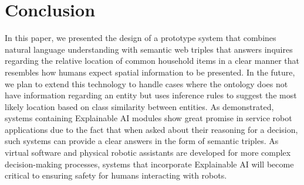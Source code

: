 \documentclass{article}
\begin{document}
\section{Conclusion}
In this paper, we presented the design of a prototype system that combines 
natural language understanding with semantic web triples that answers 
inquires regarding the relative location of common household items in a clear
manner that resembles how humans expect spatial information to be presented.
In the future, we plan to extend this technology to handle cases where the 
ontology does not have information regarding an entity but uses inference
rules to suggest the most likely location based on class similarity between
entities. As demonstrated, systems containing Explainable AI modules show
great promise in service robot applications due to the fact that when asked
about their reasoning for a decision, such systems can provide a clear answers
in the form of semantic triples. As virtual software and physical robotic 
assistants are developed for more complex decision-making processes, systems
that incorporate Explainable AI will become critical to ensuring safety for
humans interacting with robots.



\end{document}

